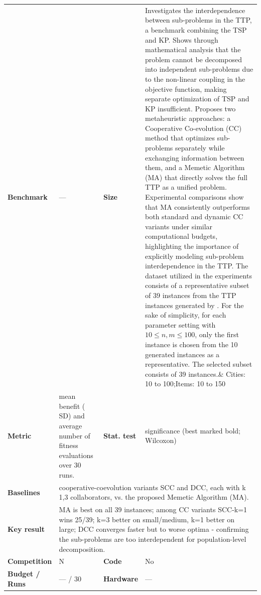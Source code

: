 \documentclass[
  a4paper,
  11pt,
  headings=small,
  numbers=noenddot,
  abstract=on,
  parskip=half,
]{scrartcl}
\begin{document}
\begin{landscape}
\begin{longtable}{@{}p{2.6cm}p{8.7cm}p{2.6cm}p{8.7cm}@{}}
\textbf{Benchmark} & --- & \textbf{Size} & Investigates the interdependence between sub-problems in the TTP, a benchmark combining the TSP and KP. Shows through mathematical analysis that the problem cannot be decomposed into independent sub-problems due to the non-linear coupling in the objective function, making separate optimization of TSP and KP insufficient.
Proposes two metaheuristic approaches: a Cooperative Co-evolution (CC) method that optimizes sub-problems separately while exchanging information between them, and a Memetic Algorithm (MA) that directly solves the full TTP as a unified problem. Experimental comparisons show that MA consistently outperforms both standard and dynamic CC variants under similar computational budgets, highlighting the importance of explicitly modeling sub-problem interdependence in the TTP. The dataset utilized in the experiments consists of a
representative subset of 39 instances from the TTP instances generated by \cite{bonyadi2013travelling}. For the sake of simplicity, for each parameter setting with $10 \le n,m \le 100$, only the first instance is chosen from the 10 generated instances as a representative. The selected subset consists of 39 instances.\& Cities: 10 to 100;\newline Items: 10 to 150 \\
\textbf{Metric} & mean benefit ( SD) and average number of fitness evaluations over 30 runs. & \textbf{Stat. test} & significance (best marked bold; Wilcoxon) \\
\textbf{Baselines} & \multicolumn{3}{p{20.0cm}}{cooperative-coevolution variants SCC and DCC, each with k 1,3 collaborators, vs. the proposed Memetic Algorithm (MA).} \\
\textbf{Key result} & \multicolumn{3}{p{20.0cm}}{MA is best on all 39 instances; among CC variants SCC-k=1 wins 25/39; k=3 better on small/medium, k=1 better on large; DCC converges faster but to worse optima - confirming the sub-problems are too interdependent for population-level decomposition.} \\
\textbf{Competition} & N & \textbf{Code} & No \\
\textbf{Budget / Runs} & --- / 30 & \textbf{Hardware} & --- \\

\end{longtable}
\end{landscape}
\end{document}

